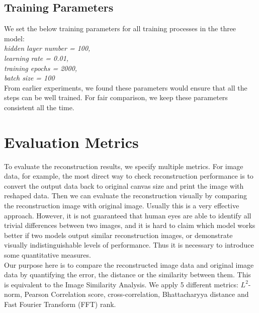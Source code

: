 \documentclass[12pt]{report} %
\begin{document}
\subsection{Training Parameters}
We set the below training parameters for all training processes in the three model:\\
\textit{hidden layer number = 100, \\
	learning rate = 0.01, \\
	training epochs = 2000, \\
	batch size = 100}\\
From earlier experiments, we found these parameters would ensure that all the steps can be well trained. For fair comparison, we keep these parameters consistent all the time.

\section{Evaluation Metrics}
To evaluate the reconstruction results, we specify multiple metrics. For image data, for example, the most direct way to check reconstruction performance is to convert the output data back to original canvas size and print the image with reshaped data. Then we can evaluate the reconstruction visually by comparing the reconstruction image with original image. Usually this is a very effective approach. However, it is not guaranteed that human eyes are able to identify all trivial differences between two images, and it is hard to claim which model works better if two models output similar reconstruction images, or demonstrate visually indistinguishable levels of performance. Thus it is necessary to introduce some quantitative measures. \\
Our purpose here is to compare the reconstructed image data and original image data by quantifying the error, the distance or the similarity between them. This is equivalent to the Image Similarity Analysis\cite{PCC,CC,ISA}. We apply 5 different metrics: $L^2$-norm\cite{NORM}, Pearson Correlation score\cite{PCC}, cross-correlation\cite{CC}, Bhattacharyya distance\cite{ISA} and Fast Fourier Transform (FFT) rank\cite{ISA}.
\end{document}
